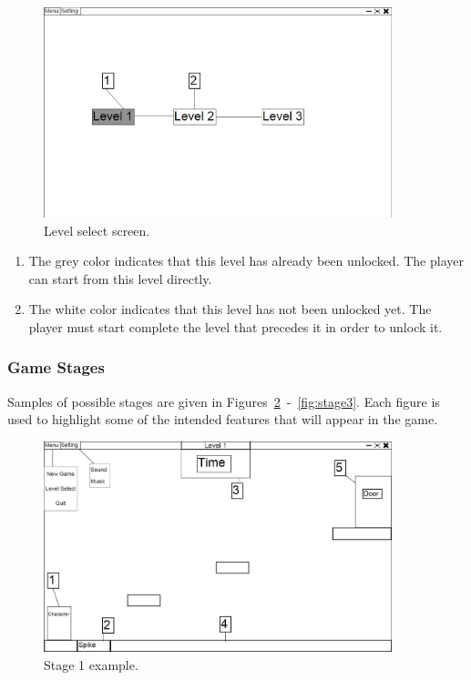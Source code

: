 \documentclass[12pt, titlepage]{article}
\begin{document}
\begin{figure}[hTB]
\begin{center}
\includegraphics[width=0.90\textwidth]{levelselect}
\caption{Level select screen.} \label{fig:levelselect}
\end{center}
\end{figure}

\begin{enumerate}
  \item The grey color indicates that this level has already been unlocked.  The player can start from this level directly.
  \item The white color indicates that this level has not been unlocked yet.  The player must start complete the level that precedes it in order to unlock it.
\end{enumerate}



\subsubsection{Game Stages}

Samples of possible stages are given in Figures~\ref*{fig:stage1}~-~\ref*{fig:stage3}.  Each figure is used to highlight some of the intended features that will appear in the game.

\newpage

\begin{figure}[hTB]
\begin{center}
\includegraphics[width=0.90\textwidth]{stage1}
\caption{Stage 1 example.} \label{fig:stage1}
\end{center}
\end{figure}
\end{document}
